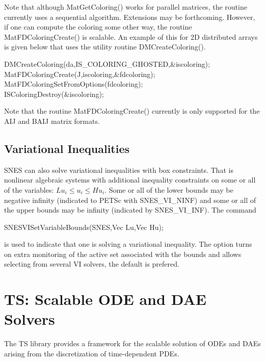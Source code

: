 Note that although MatGetColoring() works for parallel matrices, the routine currently uses a sequential algorithm.
Extensions may be forthcoming.
However, if one can compute the coloring  some other way, the routine MatFDColoringCreate() is scalable.
An example of this for 2D distributed arrays is given below that uses the utility routine DMCreateColoring().

\begin{tabbing}
   DMCreateColoring(da,IS\_COLORING\_GHOSTED,\&iscoloring);\\
   MatFDColoringCreate(J,iscoloring,\&fdcoloring); \\
   MatFDColoringSetFromOptions(fdcoloring);\\
   ISColoringDestroy(\&iscoloring);
\end{tabbing}

Note that the routine MatFDColoringCreate() currently is only supported for the AIJ and BAIJ matrix formats.

\section{Variational Inequalities}
\label{sec_vi}

SNES can also solve variational inequalities with box constraints. That is nonlinear algebraic systems with additional inequality constraints on some or all of the variables: $ Lu_i \le u_i \le Hu_i $.
Some or all of the lower bounds may be negative infinity (indicated to PETSc with SNES\_VI\_NINF) and some or all of the upper bounds may be infinity (indicated by SNES\_VI\_INF). The command
\begin{tabbing}
   SNESVISetVariableBounds(SNES,Vec Lu,Vec Hu);
\end{tabbing}
is  used to indicate that one is solving a variational inequality. The option   turns on extra monitoring of the active set associated with the bounds and   allows selecting from several VI solvers, the default is prefered.

\cleardoublepage
\chapter{TS: Scalable ODE and DAE Solvers}
\label{chapter_ts}

The TS library provides a framework for the scalable solution of ODEs and DAEs
arising from the discretization of time-dependent PDEs.

